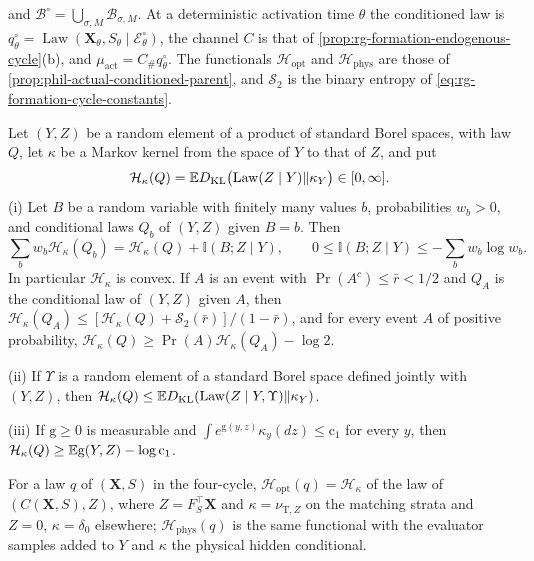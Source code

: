 and \(\mathscr B^\circ=\bigcup_{\sigma,M}\mathscr B_{\sigma,M}\). At a
deterministic activation time \(\theta\) the conditioned law is
\(q^\circ_\theta=\operatorname{Law}(\mathbf X_\theta,S_\theta\mid
\mathscr E^\circ_\theta)\), the channel \(C\) is that of
\cref{prop:rg-formation-endogenous-cycle}(b), and
\(\mu_{\mathrm{act}}=C_\#q^\circ_\theta\). The functionals
\(\mathcal H_{\mathrm{opt}}\) and \(\mathcal H_{\mathrm{phys}}\) are those of
\cref{prop:phil-actual-conditioned-parent}, and \(\mathcal S_2\) is the binary
entropy of \cref{eq:rg-formation-cycle-constants}.

Let \((Y,Z)\) be a random element of a product of standard Borel spaces, with
law \(Q\), let \(\kappa\) be a Markov kernel from the space of \(Y\) to that
of \(Z\), and put
\[
 \mathcal H_\kappa(Q)=\mathbb ED_{\mathrm{KL}}\bigl(\operatorname{Law}(Z\mid Y)\Vert\kappa_Y\bigr)
 \in[0,\infty].
\]
(i) Let \(B\) be a random variable with finitely many values \(b\),
probabilities \(w_b>0\), and conditional laws \(Q_b\) of \((Y,Z)\) given
\(B=b\). Then
\[
 \sum_bw_b\mathcal H_\kappa(Q_b)=\mathcal H_\kappa(Q)+\mathbb I(B;Z\mid Y),
 \qquad
 0\le\mathbb I(B;Z\mid Y)\le-\sum_bw_b\log w_b .
\]
In particular \(\mathcal H_\kappa\) is convex. If \(A\) is an event with
\(\Pr(A^c)\le\bar r<1/2\) and \(Q_A\) is the conditional law of \((Y,Z)\)
given \(A\), then
\(\mathcal H_\kappa(Q_A)\le[\mathcal H_\kappa(Q)+\mathcal S_2(\bar r)]/(1-\bar r)\),
and for every event \(A\) of positive probability,
\(\mathcal H_\kappa(Q)\ge\Pr(A)\mathcal H_\kappa(Q_A)-\log2\).

(ii) If \(\Upsilon\) is a random element of a standard Borel space defined
jointly with \((Y,Z)\), then
\(\mathcal H_\kappa(Q)\le\mathbb ED_{\mathrm{KL}}(\operatorname{Law}(Z\mid Y,\Upsilon)\Vert\kappa_Y)\).

(iii) If \(\mathrm g\ge0\) is measurable and
\(\int e^{\mathrm g(y,z)}\kappa_y(dz)\le\mathrm c_1\) for every \(y\), then
\(\mathcal H_\kappa(Q)\ge\mathbb E\mathrm g(Y,Z)-\log\mathrm c_1\).

For a law \(q\) of \((\mathbf X,S)\) in the four-cycle,
\(\mathcal H_{\mathrm{opt}}(q)=\mathcal H_\kappa\) of the law of
\((C(\mathbf X,S),Z)\), where \(Z=F_S^\top\mathbf X\) and
\(\kappa=\nu_{\mathrm T,Z}\) on the matching strata and \(Z=0\),
\(\kappa=\delta_0\) elsewhere; \(\mathcal H_{\mathrm{phys}}(q)\) is the same
functional with the evaluator samples added to \(Y\) and \(\kappa\) the
physical hidden conditional.


